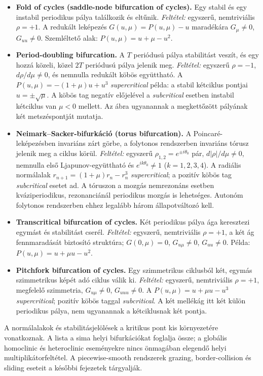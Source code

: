 \begin{itemize}
\item \textbf{Fold of cycles (saddle-node bifurcation of cycles).} Egy stabil és egy instabil periodikus pálya találkozik és eltűnik. \textit{Feltétel:} egyszerű, nemtriviális $\rho=+1$. A redukált leképezés $G(u,\mu)=P(u,\mu)-u$ maradékára $G_\mu\neq0$, $G_{uu}\neq0$. Szemléltető alak: $P(u,\mu)=u+\mu-u^2$.
\item \textbf{Period-doubling bifurcation.} A $T$ periódusú pálya stabilitást veszít, és egy hozzá közeli, közel $2T$ periódusú pálya jelenik meg. \textit{Feltétel:} egyszerű $\rho=-1$, $d\rho/d\mu\neq0$, és nemnulla redukált köbös együttható. A $P(u,\mu)=-(1+\mu)u+u^3$ \textit{supercritical} példa: a stabil kétciklus pontjai $u=\pm\sqrt\mu$. A köbös tag negatív előjelével a \textit{subcritical} esetben instabil kétciklus van $\mu<0$ mellett. Az ábra ugyanannak a megkettőzött pályának két metszéspontját mutatja.
\item \textbf{Neimark--Sacker-bifurkáció (torus bifurcation).} A Poincaré-leképezésben invariáns zárt görbe, a folytonos rendszerben invariáns tórusz jelenik meg a ciklus körül. \textit{Feltétel:} egyszerű $\rho_{1,2}=e^{\pm i\theta_0}$ pár, $d|\rho|/d\mu\neq0$, nemnulla első Ljapunov-együttható és $e^{ik\theta_0}\neq1$ ($k=1,2,3,4$). A radiális normálalak $r_{n+1}=(1+\mu)r_n-r_n^3$ \textit{supercritical}; a pozitív köbös tag \textit{subcritical} esetet ad. A tóruszon a mozgás nemrezonáns esetben kváziperiodikus, rezonanciánál periodikus mozgás is lehetséges. Autonóm folytonos rendszerben ehhez legalább három állapotváltozó kell.
\item \textbf{Transcritical bifurcation of cycles.} Két periodikus pálya ága keresztezi egymást és stabilitást cserél. \textit{Feltétel:} egyszerű, nemtriviális $\rho=+1$, a két ág fennmaradását biztosító struktúra; $G(0,\mu)=0$, $G_{u\mu}\neq0$, $G_{uu}\neq0$. Példa: $P(u,\mu)=u+\mu u-u^2$.
\item \textbf{Pitchfork bifurcation of cycles.} Egy szimmetrikus ciklusból két, egymás szimmetrikus képét adó ciklus válik ki. \textit{Feltétel:} egyszerű, nemtriviális $\rho=+1$, megfelelő szimmetria, $G_{u\mu}\neq0$, $G_{uuu}\neq0$. A $P(u,\mu)=u+\mu u-u^3$ \textit{supercritical}; pozitív köbös taggal \textit{subcritical}. A két mellékág itt két külön periodikus pálya, nem ugyanannak a kétciklusnak két pontja.
\end{itemize}
A normálalakok és stabilitásjelölések a kritikus pont kis környezetére vonatkoznak. A lista a sima helyi bifurkációkat foglalja össze; a globális homoclinic és heteroclinic eseményekre nincs önmagában elegendő helyi multiplikátorfeltétel. A piecewise-smooth rendszerek grazing, border-collision és sliding eseteit a későbbi fejezetek tárgyalják.
